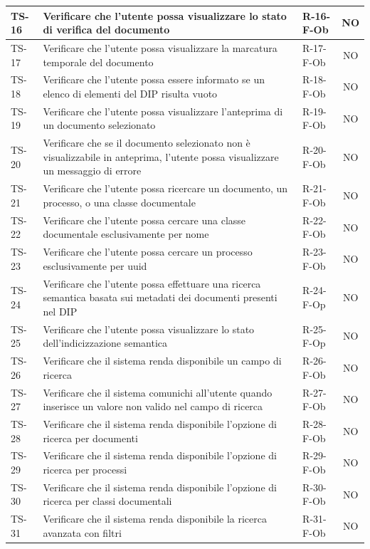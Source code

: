 \documentclass[a4paper,12pt]{article}
\begin{document}
\begin{longtable}{|p{1.5cm}|p{8.3cm}|p{2.4cm}|c|}
\hline
TS-16 & Verificare che l'utente possa visualizzare lo stato di verifica del documento & R-16-F-Ob & NO \\
\hline
TS-17 & Verificare che l'utente possa visualizzare la marcatura temporale del documento & R-17-F-Ob & NO \\
\hline
TS-18 & Verificare che l'utente possa essere informato se un elenco di elementi del DIP risulta vuoto & R-18-F-Ob & NO \\
\hline
TS-19 & Verificare che l'utente possa visualizzare l'anteprima di un documento selezionato & R-19-F-Ob & NO \\
\hline
TS-20 & Verificare che se il documento selezionato non è visualizzabile in anteprima, l'utente possa visualizzare un messaggio di errore & R-20-F-Ob & NO \\
\hline
TS-21 & Verificare che l'utente possa ricercare un documento, un processo, o una classe documentale & R-21-F-Ob & NO \\
\hline
TS-22 & Verificare che l'utente possa cercare una classe documentale esclusivamente per nome & R-22-F-Ob & NO \\
\hline
TS-23 & Verificare che l'utente possa cercare un processo esclusivamente per uuid & R-23-F-Ob & NO \\
\hline
TS-24 & Verificare che l'utente possa effettuare una ricerca semantica basata sui metadati dei documenti presenti nel DIP & R-24-F-Op & NO \\
\hline
TS-25 & Verificare che l'utente possa visualizzare lo stato dell'indicizzazione semantica & R-25-F-Op & NO \\
\hline
TS-26 & Verificare che il sistema renda disponibile un campo di ricerca & R-26-F-Ob & NO \\
\hline
TS-27 & Verificare che il sistema comunichi all'utente quando inserisce un valore non valido nel campo di ricerca & R-27-F-Ob & NO \\
\hline
TS-28 & Verificare che il sistema renda disponibile l'opzione di ricerca per documenti & R-28-F-Ob & NO \\
\hline
TS-29 & Verificare che il sistema renda disponibile l'opzione di ricerca per processi & R-29-F-Ob & NO \\
\hline
TS-30 & Verificare che il sistema renda disponibile l'opzione di ricerca per classi documentali & R-30-F-Ob & NO \\
\hline
TS-31 & Verificare che il sistema renda disponibile la ricerca avanzata con filtri & R-31-F-Ob & NO \\

\end{longtable}
\end{document}
